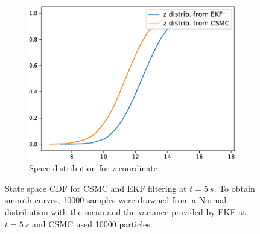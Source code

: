 \documentclass[english, DIV=13]{scrartcl}
\begin{document}
\begin{figure}
\begin{subfigure}{0.49\textwidth}
        \includegraphics[width=\textwidth]{figures/distrib-z}
        \caption{Space distribution for $z$ coordinate} 
        \label{fig:distrib-z}
    \end{subfigure}%
    \caption{State space CDF for CSMC and EKF filtering at $t = \SI{5}{s}$.
    To obtain smooth curves, 10000 samples were drawned from a Normal distribution with
    the mean and the variance provided by EKF at $t = \SI{5}{s}$ and CSMC used 10000
    particles.}
    \label{fig:space-cdf}
\end{figure}



\end{document}
